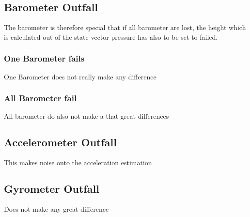 \subsection{Barometer Outfall}
The barometer is therefore special that if all barometer are lost, the height which is calculated out of the state vector pressure has also to be set to failed.
\subsubsection{One Barometer fails}
One Barometer does not really make any difference
\subsubsection{All Barometer fail}
All barometer do also not make a that great differences
\subsection{Accelerometer Outfall}
This makes noise onto the acceleration estimation
\subsection{Gyrometer Outfall}
Does not make any great difference